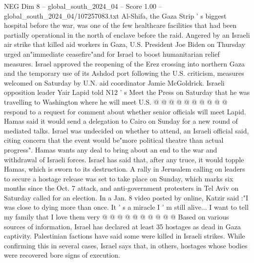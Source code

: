 \begin{textsample}{NEG Dim 8 – global\_south\_2024\_04 – Score 1.00 – global\_south\_2024\_04/107257083.txt}
Al-Shifa, the Gaza Strip ' s biggest hospital before the war, was one of the few healthcare facilities that had been partially operational in the north of enclave before the raid.
Angered by an Israeli air strike that killed aid workers in Gaza, U.S.
President Joe Biden on Thursday urged an"immediate ceasefire"and for Israel to boost humanitarian relief measures.
Israel approved the reopening of the Erez crossing into northern Gaza and the temporary use of its Ashdod port following the U.S. criticism, measures welcomed on Saturday by U.N. aid coordinator Jamie McGoldrick.
Israeli opposition leader Yair Lapid told N12 ' s Meet the Press on Saturday that he was travelling to Washington where he will meet U.S. @ @ @ @ @ @ @ @ @ @ respond to a request for comment about whether senior officials will meet Lapid.
Hamas said it would send a delegation to Cairo on Sunday for a new round of mediated talks.
Israel was undecided on whether to attend, an Israeli official said, citing concern that the event would be"more political theatre than actual progress".
Hamas wants any deal to bring about an end to the war and withdrawal of Israeli forces.
Israel has said that, after any truce, it would topple Hamas, which is sworn to its destruction.
A rally in Jerusalem calling on leaders to secure a hostage release was set to take place on Sunday, which marks six months since the Oct. 7 attack, and anti-government protesters in Tel Aviv on Saturday called for an election.
In a Jan. 8 video posted by online, Katzir said :"I was close to dying more than once.
It ' s a miracle I ' m still alive...
I want to tell my family that I love them very @ @ @ @ @ @ @ @ @ @ Based on various sources of information, Israel has declared at least 35 hostages as dead in Gaza captivity.
Palestinian factions have said some were killed in Israeli strikes.
While confirming this in several cases, Israel says that, in others, hostages whose bodies were recovered bore signs of execution.

\end{textsample}
